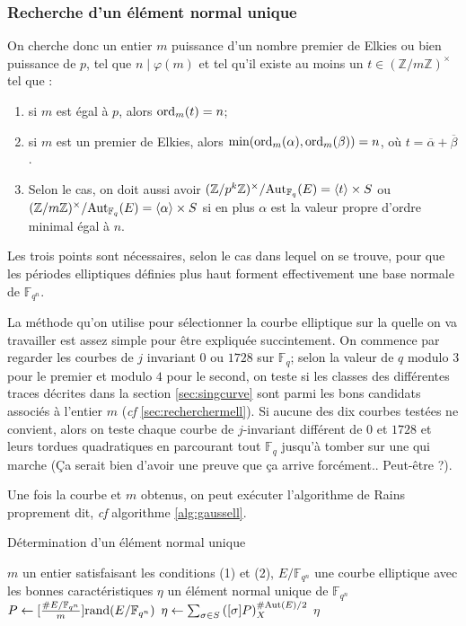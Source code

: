 \documentclass[a4paper]{article} %
\numberwithin{section}{part}
\numberwithin{equation}{section}
\newcommand\zmodninv[1]{(\mathbb{Z}/#1\mathbb{Z})^{\times}}
\newcommand\GF[1]{\mathbb{F}_{#1}}
\newcommand\EO{\mathcal{O}}
\newcommand\groupgen[1]{\langle{#1}\rangle}
\newcommand\ord[2]{\textup{ord}_{#1}(#2)}
\begin{document}
\subsubsection*{Recherche d'un élément normal unique}
On cherche donc un entier $m$ puissance d'un nombre premier de Elkies ou bien
puissance de $p$, tel que $n\mid\varphi(m)$ et tel qu'il existe au moins un 
$t\in\zmodninv{m}$ tel que :

\vspace{0.3cm}
\begin{enumerate}[(1)]
    \item si $m$ est égal à $p$, alors $\ord{m}{t} = n$;

    \item si $m$ est un premier de Elkies, alors
    $\textup{min}(\ord{m}{\alpha},\ord{m}{\beta}) = n$, où $t = 
    \overline{\alpha} + \overline{\beta}$.

    \item Selon le cas, on doit aussi avoir
    $\zmodninv{p^k}/\textup{Aut}_{\GF{q}}(E) = \groupgen{t}\times S$ ou
    $\zmodninv{m}/\textup{Aut}_{\GF{q}}(E) = \groupgen{\alpha}\times S$ si en
    plus $\alpha$ est la valeur propre d'ordre minimal égal à $n$.
\end{enumerate}
\vspace{0.3cm}
Les trois points sont nécessaires, selon le cas dans lequel on se trouve, pour
que les périodes elliptiques définies plus haut forment effectivement une base
normale de $\GF{q^n}$.\par
La méthode qu'on utilise pour sélectionner la courbe elliptique sur la quelle on
va travailler est assez simple pour être expliquée succintement. On commence par
regarder les courbes de $j$ invariant $0$ ou $1728$ sur $\GF{q}$; selon la
valeur de $q$ modulo $3$ pour le premier et modulo $4$ pour le second, on teste
si les classes des différentes traces décrites dans la section
\ref{sec:singcurve} sont parmi les bons candidats associés à l'entier $m$
(\emph{cf} \ref{sec:recherchermell}). Si aucune des dix courbes testées ne
convient, alors on teste chaque courbe de $j$-invariant différent de $0$ et 
$1728$ et leurs tordues quadratiques en parcourant tout $\GF{q}$ jusqu'à tomber 
sur une qui marche (Ça serait bien d'avoir une preuve que ça arrive forcément.. 
Peut-être \cite{CasHen} ?).\par
Une fois la courbe et $m$ obtenus, on peut exécuter l'algorithme de Rains
proprement dit, \emph{cf} algorithme \ref{alg:gaussell}.
\begin{algorithm}
\caption{Détermination d'un élément normal unique}
\label{alg:gaussell}
\begin{algorithmic}[1]
\REQUIRE $m$ un entier satisfaisant les conditions (1) et (2), $E/\GF{q^n}$ une 
courbe elliptique avec les bonnes caractéristiques
\ENSURE $\eta$ un élément normal unique de $\GF{q^n}$
\bigskip
\REPEAT
    \STATE $P \leftarrow [\frac{\#E/\GF{q^n}}{m}]\textup{rand}(E/\GF{q^n})$
\UNTIL{$[m]P = \EO\quad\&\quad\forall d\mid m, d\neq m, [d]P\neq\EO$}
\STATE $\eta \leftarrow \sum_{\sigma\in
S}{\left([\sigma]P\right)_X^{\#\textup{Aut}(E)/2}}$
\RETURN $\eta$
\end{algorithmic}
\end{algorithm}
\end{document}
